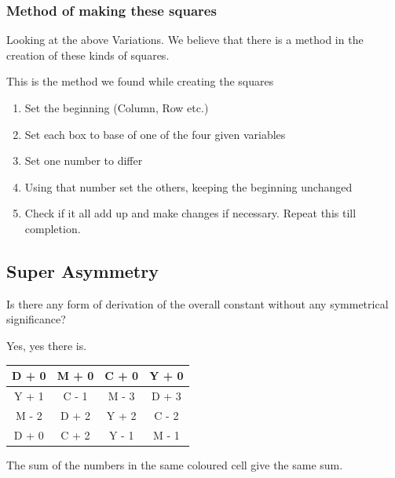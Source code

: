 \documentclass{article}
\begin{document}
    \subsubsection{Method of making these squares}
        Looking at the above Variations. We believe that there is a method in the creation of these kinds of squares.
        
        This is the method we found while creating the squares
        
        \begin{enumerate}
            \item Set the beginning (Column, Row etc.) 
            \item Set each box to base of one of the four given variables 
            \item Set one number to differ
            \item Using that number set the others, keeping the beginning unchanged
            \item Check if it all add up and make changes if necessary. Repeat this till completion.
        \end{enumerate}
        
\subsection{Super Asymmetry}
Is there any form of derivation of the overall constant without any symmetrical significance?

Yes, yes there is.

\begin{center}
            \begin{tabular}{|c|c|c|c|}
                \hline
                \cellcolor{yellow} D + 0 & \cellcolor{yellow} M + 0 & \cellcolor{orange} C + 0 & \cellcolor{aqua} Y + 0 \\
                \hline
                \cellcolor{orange} Y + 1 & \cellcolor{aqua} C - 1 & \cellcolor{orange} M - 3 & \cellcolor{aqua} D + 3 \\
                \hline
                \cellcolor{aqua} M - 2 & \cellcolor{orange} D + 2 & \cellcolor{green} Y + 2 & \cellcolor{green} C - 2 \\
                \hline
                \cellcolor{green} D + 0 & \cellcolor{yellow} C + 2 & \cellcolor{yellow} Y - 1 & \cellcolor{green} M - 1 \\
                \hline
            \end{tabular}
        \end{center}

The sum of the numbers in the same coloured cell give the same sum.
\end{document}
